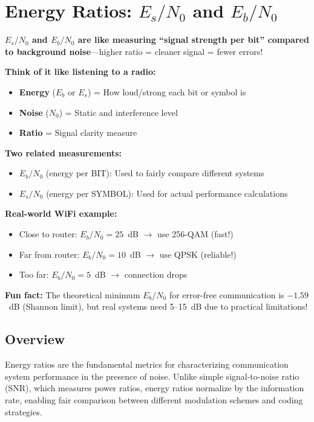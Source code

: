 \chapter{Energy Ratios: $E_s/N_0$ and $E_b/N_0$}
\label{ch:energy-ratios}

\begin{nontechnical}
\textbf{$E_s/N_0$ and $E_b/N_0$ are like measuring ``signal strength per bit'' compared to background noise}---higher ratio = cleaner signal = fewer errors!

\textbf{Think of it like listening to a radio:}
\begin{itemize}
\item \textbf{Energy} ($E_b$ or $E_s$) = How loud/strong each bit or symbol is
\item \textbf{Noise} ($N_0$) = Static and interference level
\item \textbf{Ratio} = Signal clarity measure
\end{itemize}

\textbf{Two related measurements:}
\begin{itemize}
\item \textbf{$E_b/N_0$} (energy per BIT): Used to fairly compare different systems
\item \textbf{$E_s/N_0$} (energy per SYMBOL): Used for actual performance calculations
\end{itemize}

\textbf{Real-world WiFi example:}
\begin{itemize}
\item Close to router: $E_b/N_0 = 25$~dB $\rightarrow$ use 256-QAM (fast!)
\item Far from router: $E_b/N_0 = 10$~dB $\rightarrow$ use QPSK (reliable!)
\item Too far: $E_b/N_0 = 5$~dB $\rightarrow$ connection drops
\end{itemize}

\textbf{Fun fact:} The theoretical minimum $E_b/N_0$ for error-free communication is $-1.59$~dB (Shannon limit), but real systems need 5--15~dB due to practical limitations!
\end{nontechnical}

\section{Overview}

Energy ratios are the fundamental metrics for characterizing communication system performance in the presence of noise. Unlike simple signal-to-noise ratio (SNR), which measures power ratios, energy ratios normalize by the information rate, enabling fair comparison between different modulation schemes and coding strategies.

